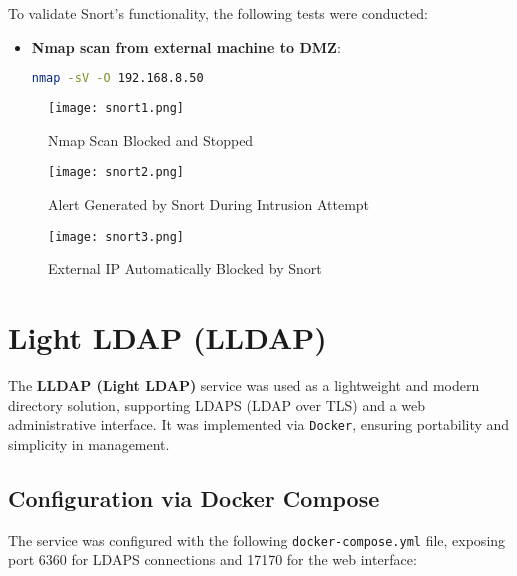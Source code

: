 \documentclass[12pt]{report}
\begin{document}
To validate Snort's functionality, the following tests were conducted:

\begin{itemize}
    \item \textbf{Nmap scan from external machine to DMZ}:

\begin{lstlisting}[language=bash, caption={Nmap Scan}]
nmap -sV -O 192.168.8.50
\end{lstlisting}
\end{itemize}

\begin{figure}[h]
    \centering
    \texttt{[image: snort1.png]}
    \caption{Nmap Scan Blocked and Stopped}
    \label{fig:snort-nmap}
\end{figure}

\begin{figure}[h]
    \centering
    \texttt{[image: snort2.png]}
    \caption{Alert Generated by Snort During Intrusion Attempt}
    \label{fig:snort-alert}
\end{figure}

\begin{figure}[h]
    \centering
    \texttt{[image: snort3.png]}
    \caption{External IP Automatically Blocked by Snort}
    \label{fig:snort-block}
\end{figure}

\clearpage

\section*{Light LDAP (LLDAP)}

The \textbf{LLDAP (Light LDAP)} service was used as a lightweight and modern directory solution, supporting LDAPS (LDAP over TLS) and a web administrative interface. It was implemented via \texttt{Docker}, ensuring portability and simplicity in management.

\subsection*{Configuration via Docker Compose}

The service was configured with the following \texttt{docker-compose.yml} file, exposing port 6360 for LDAPS connections and 17170 for the web interface:
\end{document}
